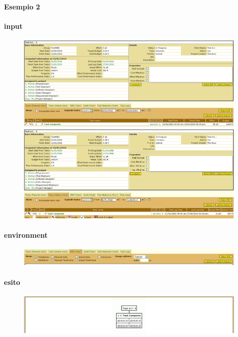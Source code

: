 \paragraph{Esempio 2}
\paragraph{input}
\begin{figure}
\centering
\includegraphics[width=\textwidth]{tests/TEST_WBS/4.1/4.1_3/Esempio_2/input.png}
\includegraphics[width=\textwidth]{tests/TEST_WBS/4.1/4.1_3/Esempio_2/input_actual.png}
\end{figure}
\paragraph{environment}
\begin{figure}
\centering
\includegraphics[width=\textwidth]{tests/TEST_WBS/4.1/4.1_3/Esempio_2/environment.png}
\end{figure}
\paragraph{esito}
\begin{figure}
\centering
\includegraphics[width=\textwidth]{tests/TEST_WBS/4.1/4.1_3/Esempio_2/output.png}
\end{figure}

